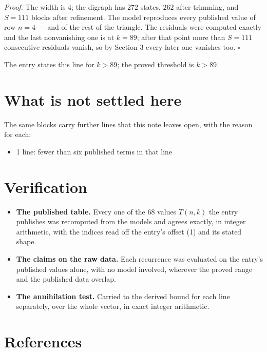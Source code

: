 \documentclass[11pt]{article}
\theoremstyle{definition}
\begin{document}
{\itshape Proof.} The width is $4$; the digraph has $272$ states, $262$ after trimming, and $S = 111$ blocks after refinement. The model reproduces every published value of row $n = 4$ --- and of the rest of the triangle. The residuals were computed exactly and the last nonvanishing one is at $k = 89$; after that point more than $S = 111$ consecutive residuals vanish, so by Section 3 every later one vanishes too. $\square$

The entry states this line for $k > 89$; the proved threshold is $k > 89$.

\section{What is not settled here}

The same blocks carry further lines that this note leaves open, with the reason for each:

\begin{itemize}

\item 1 line: fewer than six published terms in that line

\end{itemize}

\section{Verification}

\begin{itemize}

\item {\bfseries The published table.} Every one of the 68 values $T(n,k)$ the entry publishes was recomputed from the models and agrees exactly, in integer arithmetic, with the indices read off the entry's offset (1) and its stated shape.

\item {\bfseries The claims on the raw data.} Each recurrence was evaluated on the entry's published values alone, with no model involved, wherever the proved range and the published data overlap.

\item {\bfseries The annihilation test.} Carried to the derived bound for each line separately, over the whole vector, in exact integer arithmetic.

\end{itemize}

\section{References}
\end{document}
